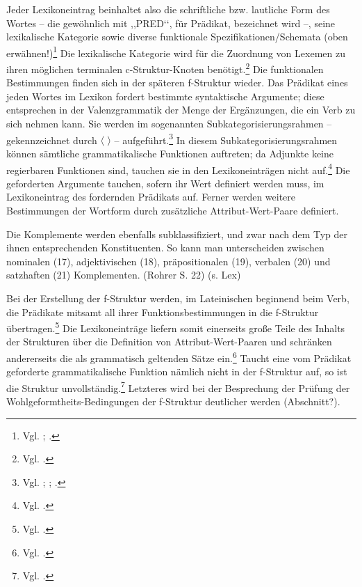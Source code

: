 \documentclass[12pt,a4paper]{article}
\begin{document}
Jeder Lexikoneintrag beinhaltet also die schriftliche bzw. lautliche Form des Wortes -- die gewöhnlich mit ,,PRED‘‘, für Prädikat, bezeichnet wird --, seine lexikalische Kategorie sowie diverse funktionale Spezifikationen/Schemata (oben erwähnen!)\footnote{Vgl. \cite[27; 33]{Rohrer}; \cite[16]{Skript}.} Die lexikalische Kategorie wird für die Zuordnung von Lexemen zu ihren möglichen terminalen c-Struktur-Knoten benötigt.\footnote{Vgl. \cite[63]{Skript}.} Die funktionalen Bestimmungen finden sich in der späteren f-Struktur wieder. Das Prädikat eines jeden Wortes im Lexikon fordert bestimmte syntaktische Argumente; diese entsprechen in der Valenzgrammatik der Menge der Ergänzungen, die ein Verb zu sich nehmen kann. Sie werden im sogenannten Subkategorisierungsrahmen -- gekennzeichnet durch $\langle$ $\rangle$ -- aufgeführt.\footnote{Vgl. \cite[7]{Dal}; \cite[70]{Skript}; \cite[27]{Rohrer}.} In diesem Subkategorisierungsrahmen können sämtliche grammatikalische Funktionen auftreten; da Adjunkte keine regierbaren Funktionen sind, tauchen sie in den Lexikoneinträgen nicht auf.\footnote{Vgl. \cite[27]{Rohrer}.} Die geforderten Argumente tauchen, sofern ihr Wert definiert werden muss, im Lexikoneintrag des fordernden Prädikats auf. Ferner werden weitere Bestimmungen der Wortform durch zusätzliche Attribut-Wert-Paare definiert.


Die Komplemente werden ebenfalls subklassifiziert, und zwar nach dem Typ der ihnen entsprechenden Konstituenten. So kann man unterscheiden zwischen nominalen (17), adjektivischen (18), präpositionalen (19), verbalen (20) und satzhaften (21) Komplementen. (Rohrer S. 22) (s. Lex)

Bei der Erstellung der f-Struktur werden, im Lateinischen beginnend beim Verb, die Prädikate mitsamt all ihrer Funktionsbestimmungen in die f-Struktur übertragen.\footnote{Vgl. \cite[28]{Rohrer}.} Die Lexikoneinträge liefern somit einerseits große Teile des Inhalts der Strukturen über die Definition von Attribut-Wert-Paaren und schränken andererseits die als grammatisch geltenden Sätze ein.\footnote{Vgl. \cite[63]{Skript}.}  Taucht eine vom Prädikat geforderte grammatikalische Funktion nämlich nicht in der f-Struktur auf, so ist die Struktur unvollständig.\footnote{Vgl. \cite[28]{Rohrer}.} Letzteres wird bei der Besprechung der Prüfung der Wohlgeformtheits-Bedingungen der f-Struktur deutlicher werden (Abschnitt?).
\end{document}
